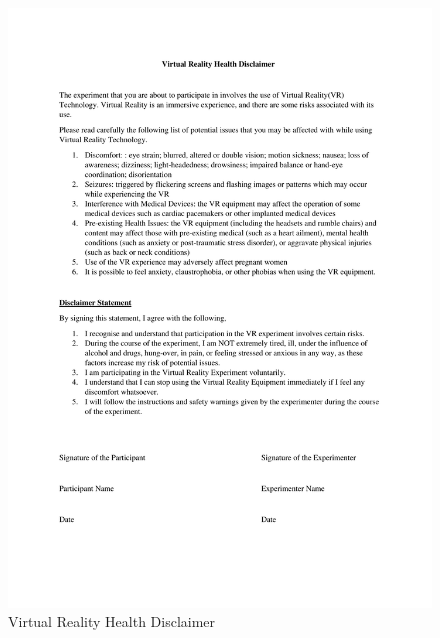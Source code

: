 \begin{figure}[h!]
\centering       
    \includegraphics[width=\textwidth, keepaspectratio]{Images/admin/Virtual Reality Health Disclaimer- Updated-1.png}
    \caption{ Virtual Reality Health Disclaimer}
    \label{}
\end{figure}

